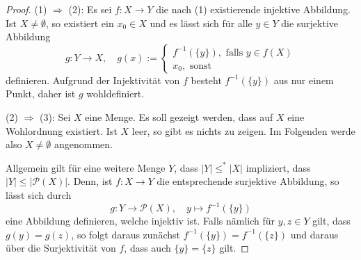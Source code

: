 \begin{proof}
  (1) $\Rightarrow$ (2):
  Es sei $f \colon X \to Y$ die nach (1) existierende injektive Abbildung.
  Ist $X \neq \emptyset$, so existiert ein $x_0 \in X$ und es lässt sich für alle $y \in Y$ die surjektive Abbildung
  \begin{displaymath}
    g \colon Y \to X, \quad g(x) := 
    \begin{cases}
      f^{-1}(\{y\}), \text{ falls } y \in f(X)\\
      x_0, \text{ sonst}
    \end{cases}
  \end{displaymath}
  definieren. Aufgrund der Injektivität von $f$ besteht $f^{-1}(\{y\})$ aus nur einem Punkt, daher ist $g$ wohldefiniert.

  (2) $\Rightarrow$ (3):
  Sei $X$ eine Menge.
  Es soll gezeigt werden, dass auf $X$ eine Wohlordnung existiert. 
  Ist $X$ leer, so gibt es nichts zu zeigen. Im Folgenden werde also $X \neq \emptyset$ angenommen.

  Allgemein gilt für eine weitere Menge $Y$, dass $|Y| \leq^* |X|$ impliziert, dass $|Y| \leq |\mathcal{P}(X)|$.
  Denn, ist $f \colon X \to Y$ die entsprechende surjektive Abbildung, so lässt sich durch
  \begin{displaymath}
    g \colon Y \to \mathcal{P}(X), \quad y \mapsto f^{-1}(\{y\})
  \end{displaymath}
  eine Abbildung definieren, welche injektiv ist.
  Falls nämlich für $y,z \in Y$ gilt, dass $g(y) = g(z)$, so folgt daraus zunächst $f^{-1}(\{y\}) = f^{-1}(\{z\})$ und daraus über die Surjektivität von $f$, dass auch $\{y\} = \{z\}$ gilt.



\end{proof}
